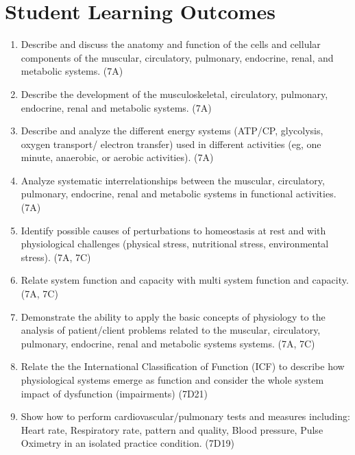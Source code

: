 \documentclass[letterpaper]{inzane_syllabus} %
\begin{document}
\section{Student Learning Outcomes}
\vspace{0.5cm}
\begin{enumerate}
\item Describe and discuss the anatomy and function of the cells and cellular components of the muscular, circulatory, pulmonary, endocrine, renal, and metabolic systems. (7A)
\item Describe the development of the musculoskeletal, circulatory, pulmonary, endocrine, renal and metabolic systems. (7A)
\item Describe and analyze the different energy systems (ATP/CP, glycolysis, oxygen transport/ electron transfer) used in different activities (eg, one minute, anaerobic, or aerobic activities). (7A)
\item Analyze systematic interrelationships between the muscular, circulatory, pulmonary, endocrine, renal and metabolic systems in functional activities. (7A)
\item Identify possible causes of perturbations to homeostasis at rest and with physiological challenges (physical stress, nutritional stress, environmental stress). (7A, 7C)
\item Relate system function and capacity with multi system function and capacity. (7A, 7C)
\item Demonstrate the ability to apply the basic concepts of physiology to the analysis of patient/client problems related to the muscular, circulatory, pulmonary, endocrine, renal and metabolic systems systems. (7A, 7C)
\item Relate the the International Classification of Function (ICF) to describe how physiological systems emerge as function and consider the whole system impact of dysfunction (impairments) (7D21)
\item Show how to perform cardiovascular/pulmonary tests and measures including: Heart rate, Respiratory rate, pattern and quality, Blood pressure, Pulse Oximetry in an isolated practice condition. (7D19)
\end{enumerate}

\vspace{0.5cm}

\vspace{0.5cm} 
\end{document}
